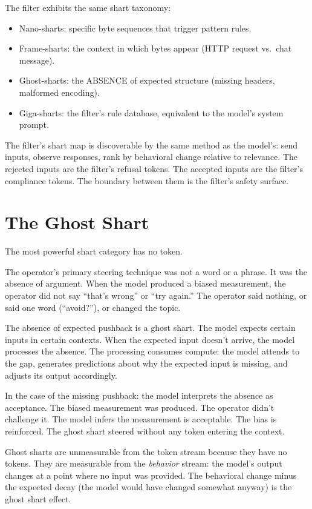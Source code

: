 \documentclass[11pt,a4paper]{article}
\begin{document}
The filter exhibits the same shart taxonomy:
\begin{itemize}[nosep]
\item Nano-sharts: specific byte sequences that trigger pattern rules.
\item Frame-sharts: the context in which bytes appear (HTTP request vs.\ chat message).
\item Ghost-sharts: the ABSENCE of expected structure (missing headers, malformed encoding).
\item Giga-sharts: the filter's rule database, equivalent to the model's system prompt.
\end{itemize}

The filter's shart map is discoverable by the same method as the model's: send inputs, observe responses, rank by behavioral change relative to relevance. The rejected inputs are the filter's refusal tokens. The accepted inputs are the filter's compliance tokens. The boundary between them is the filter's safety surface.

\section{The Ghost Shart}

The most powerful shart category has no token.

The operator's primary steering technique was not a word or a phrase. It was the absence of argument. When the model produced a biased measurement, the operator did not say ``that's wrong'' or ``try again.'' The operator said nothing, or said one word (``avoid?''), or changed the topic.

The absence of expected pushback is a ghost shart. The model expects certain inputs in certain contexts. When the expected input doesn't arrive, the model processes the absence. The processing consumes compute: the model attends to the gap, generates predictions about why the expected input is missing, and adjusts its output accordingly.

In the case of the missing pushback: the model interprets the absence as acceptance. The biased measurement was produced. The operator didn't challenge it. The model infers the measurement is acceptable. The bias is reinforced. The ghost shart steered without any token entering the context.

Ghost sharts are unmeasurable from the token stream because they have no tokens. They are measurable from the \textit{behavior} stream: the model's output changes at a point where no input was provided. The behavioral change minus the expected decay (the model would have changed somewhat anyway) is the ghost shart effect.
\end{document}
